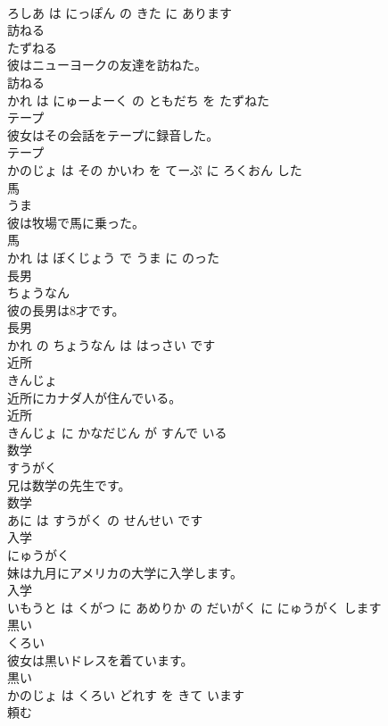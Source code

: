 \documentclass[8pt]{extreport}
\begin{document}
\begin{CJK}{UTF8}{min}
\\	ろしあ は にっぽん の きた に あります			
\\	訪ねる	
\\	たずねる			
\\	彼はニューヨークの友達を訪ねた。	
\\	訪ねる 
\\	かれ は にゅーよーく の ともだち を たずねた			
\\	テープ	
\\	彼女はその会話をテープに録音した。	
\\	テープ 
\\	かのじょ は その かいわ を てーぷ に ろくおん した			
\\	馬	
\\	うま			
\\	彼は牧場で馬に乗った。	
\\	馬 
\\	かれ は ぼくじょう で うま に のった			
\\	長男	
\\	ちょうなん			
\\	彼の長男は8才です。	
\\	長男 
\\	かれ の ちょうなん は はっさい です			
\\	近所	
\\	きんじょ			
\\	近所にカナダ人が住んでいる。	
\\	近所 
\\	きんじょ に かなだじん が すんで いる			
\\	数学	
\\	すうがく			
\\	兄は数学の先生です。	
\\	数学 
\\	あに は すうがく の せんせい です			
\\	入学	
\\	にゅうがく			
\\	妹は九月にアメリカの大学に入学します。	
\\	入学 
\\	いもうと は くがつ に あめりか の だいがく に にゅうがく します			
\\	黒い	
\\	くろい			
\\	彼女は黒いドレスを着ています。	
\\	黒い 
\\	かのじょ は くろい どれす を きて います			
\\	頼む	

\end{CJK}
\end{document}
